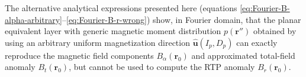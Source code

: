 The alternative analytical expressions presented here 
(equations \ref{eq:Fourier-B-alpha-arbitrary}--\ref{eq:Fourier-B-r-wrong})
show, in Fourier domain, that the planar equivalent layer with 
generic magnetic moment distribution 
$p(\mathbf{r}'')$ obtained by using an arbitrary uniform magnetization direction
$\hat{\mathbf{u}}(I_{p}, D_{p})$ can exactly reproduce the magnetic field components
$B_{\alpha}(\mathbf{r}_{0})$ and approximated total-field anomaly
$B_{t}(\mathbf{r}_{0})$, but cannot be used to compute the RTP anomaly
$B_{r}(\mathbf{r}_{0})$.
